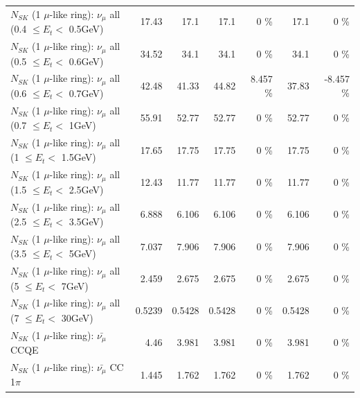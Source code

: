 \begin{table}
\begin{tabular}{| l | r | r | r  r | r  r |}
       $N_{SK}$ (1 $\mu$-like ring): $\nu_{\mu}$ all (0.4 $\leq E_{t} <$ 0.5GeV) &           17.43 &            17.1 &            17.1 &        0 \%  &            17.1 &        0 \%  \\ 
       $N_{SK}$ (1 $\mu$-like ring): $\nu_{\mu}$ all (0.5 $\leq E_{t} <$ 0.6GeV) &           34.52 &            34.1 &            34.1 &        0 \%  &            34.1 &        0 \%  \\ 
       $N_{SK}$ (1 $\mu$-like ring): $\nu_{\mu}$ all (0.6 $\leq E_{t} <$ 0.7GeV) &           42.48 &           41.33 &           44.82 &    8.457 \%  &           37.83 &   -8.457 \%  \\ 
         $N_{SK}$ (1 $\mu$-like ring): $\nu_{\mu}$ all (0.7 $\leq E_{t} <$ 1GeV) &           55.91 &           52.77 &           52.77 &        0 \%  &           52.77 &        0 \%  \\ 
         $N_{SK}$ (1 $\mu$-like ring): $\nu_{\mu}$ all (1 $\leq E_{t} <$ 1.5GeV) &           17.65 &           17.75 &           17.75 &        0 \%  &           17.75 &        0 \%  \\ 
       $N_{SK}$ (1 $\mu$-like ring): $\nu_{\mu}$ all (1.5 $\leq E_{t} <$ 2.5GeV) &           12.43 &           11.77 &           11.77 &        0 \%  &           11.77 &        0 \%  \\ 
       $N_{SK}$ (1 $\mu$-like ring): $\nu_{\mu}$ all (2.5 $\leq E_{t} <$ 3.5GeV) &           6.888 &           6.106 &           6.106 &        0 \%  &           6.106 &        0 \%  \\ 
         $N_{SK}$ (1 $\mu$-like ring): $\nu_{\mu}$ all (3.5 $\leq E_{t} <$ 5GeV) &           7.037 &           7.906 &           7.906 &        0 \%  &           7.906 &        0 \%  \\ 
           $N_{SK}$ (1 $\mu$-like ring): $\nu_{\mu}$ all (5 $\leq E_{t} <$ 7GeV) &           2.459 &           2.675 &           2.675 &        0 \%  &           2.675 &        0 \%  \\ 
          $N_{SK}$ (1 $\mu$-like ring): $\nu_{\mu}$ all (7 $\leq E_{t} <$ 30GeV) &          0.5239 &          0.5428 &          0.5428 &        0 \%  &          0.5428 &        0 \%  \\ 
\hline
\hline
\hline
                              $N_{SK}$ (1 $\mu$-like ring): $\bar{\nu_\mu}$ CCQE &            4.46 &           3.981 &           3.981 &        0 \%  &           3.981 &        0 \%  \\ 
                         $N_{SK}$ (1 $\mu$-like ring): $\bar{\nu_\mu}$ CC 1$\pi$ &           1.445 &           1.762 &           1.762 &        0 \%  &           1.762 &        0 \%  \\ 

\end{tabular}
\end{table}
